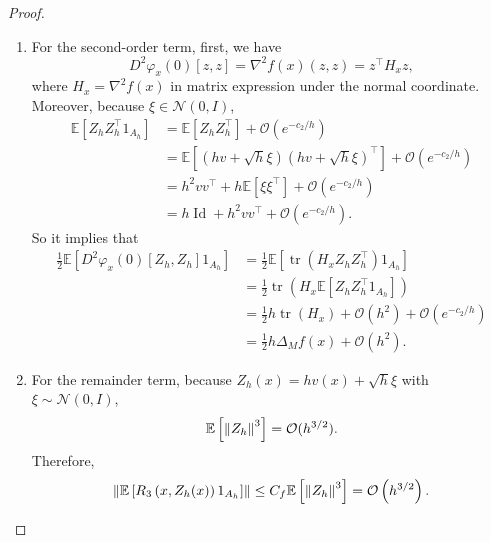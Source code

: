 \begin{proof}
\begin{enumerate}[label=\Roman{*}.]
\begin{enumerate}[label=(\alph{*})]
            \item For the second-order term, first, we have
            \begin{equation*}
                D ^2\varphi_x(0)[z,z] = \nabla^2f(x)(z,z) = z^\top H_x z,
            \end{equation*}
            where $H_x = \nabla^2f(x)$ in matrix expression under the normal coordinate. Moreover, because $\xi \in \mathcal{N}(0,I)$,
            \begin{align*}
                \mathbb{E}\left[Z_h Z_h^{\top} 1_{A_h}\right] & =\mathbb{E}\left[Z_h Z_h^{\top}\right]+\mathcal{O}\left(e^{-c_2 / h}\right) \\
                & =\mathbb{E}\left[(h v+\sqrt{h} \xi)(h v+\sqrt{h} \xi)^{\top}\right]+\mathcal{O}\left(e^{-c_2 / h}\right) \\
                & =h^2 v v^{\top}+h \mathbb{E}\left[\xi \xi^{\top}\right]+\mathcal{O}\left(e^{-c_2 / h}\right) \\
                & =h \operatorname{Id}+h^2 v v^{\top}+\mathcal{O}\left(e^{-c_2 / h}\right) .
            \end{align*}
            So it implies that
            \begin{align*}
                \frac{1}{2} \mathbb{E}\left[D^2 \varphi_x(0)\left[Z_h, Z_h\right] 1_{A_h}\right] & =\frac{1}{2} \mathbb{E}\left[\operatorname{tr}\left(H_x Z_h Z_h^{\top}\right) 1_{A_h}\right] \\
                & =\frac{1}{2} \operatorname{tr}\left(H_x \mathbb{E}\left[Z_h Z_h^{\top} 1_{A_h}\right]\right) \\
                & =\frac{1}{2} h \operatorname{tr}\left(H_x\right)+\mathcal{O}\left(h^2\right)+\mathcal{O}\left(e^{-c_2 / h}\right) \\
                & =\frac{1}{2} h \Delta_M f(x)+\mathcal{O}\left(h^2\right) .
            \end{align*}

            \item For the remainder term, because $Z_h(x) = hv(x) + \sqrt{h}\xi$ with $\xi \sim \mathcal{N}(0,I)$,
            \begin{equation*}
                \mathbb{E}\left[\left\lVert Z_h\right\lVert^3\right] = \mathcal{O}(h^{3/2}).
            \end{equation*}
            Therefore,
            \begin{equation*}
                \left\|\mathbb{E}\left[R_3\left(x, Z_h(x)\right) 1_{A_h}\right]\right\| \leq C_f \mathbb{E}\left[\left\|Z_h\right\|^3\right]=\mathcal{O}\left(h^{3/2}\right) .
            \end{equation*}
        \end{enumerate}


\end{enumerate}
\end{proof}
